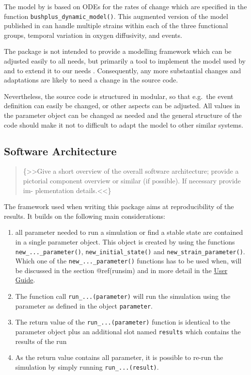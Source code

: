 \documentclass[]{elsarticle} %
\providecommand{\tightlist}{%
  \setlength{\itemsep}{0pt}\setlength{\parskip}{0pt}}
\begin{document}
The model by \citet{Bush2017} is based on ODEs for the rates of change
which are specified in the function \texttt{bushplus\_dynamic\_model()}.
This augmented version of the model published in \citep{Bush2017} can
handle multiple strains within each of the three functional groups,
temporal variation in oxygen diffusivity, and events.

The package is not intended to provide a modelling framework which can
be adjusted easily to all needs, but primarily a tool to implement the
model used by \citep{Bush2017} and to extend it to our needs
\citep{REF_NEEDED}. Consequently, any more substantial changes and
adaptations are likely to need a change in the source code.

Nevertheless, the source code is structured in modular, so that e.g.~the
event definition can easily be changed, or other aspects can be
adjusted. All values in the parameter object can be changed as needed
and the general structure of the code should make it not to difficult to
adapt the model to other similar systems.

\hypertarget{software-architecture}{%
\subsection{Software Architecture}\label{software-architecture}}

\begin{quote}
\{\textgreater\textgreater Give a short overview of the overall software
architecture; provide a pictorial component overview or similar (if
possible). If necessary provide im- plementation
details.\textless\textless\}
\end{quote}

The framework used when writing this package aims at reproducibility of
the results. It builds on the following main considerations:

\begin{enumerate}
\def\labelenumi{\arabic{enumi}.}
\tightlist
\item
  all parameter needed to run a simulation or find a stable state are
  contained in a single parameter object. This object is created by
  using the functions \texttt{new\_...\_parameter()},
  \texttt{new\_initial\_state()} and \texttt{new\_strain\_parameter()}.
  Which one of the \texttt{new\_...\_parameter()} functions has to be
  used when, will be discussed in the section @ref(runsim) and in more
  detail in the \href{LINK_NEEDED}{User Guide}.
\item
  The function call \texttt{run\_...(parameter)} will run the simulation
  using the parameter as defined in the object \texttt{parameter}.
\item
  The return value of the \texttt{run\_...(parameter)} function is
  identical to the parameter object plus an additional slot named
  \texttt{results} which contains the results of the run
\item
  As the return value contains all parameter, it is possible to re-run
  the simulation by simply running \texttt{run\_...(result)}.
\end{enumerate}
\end{document}
